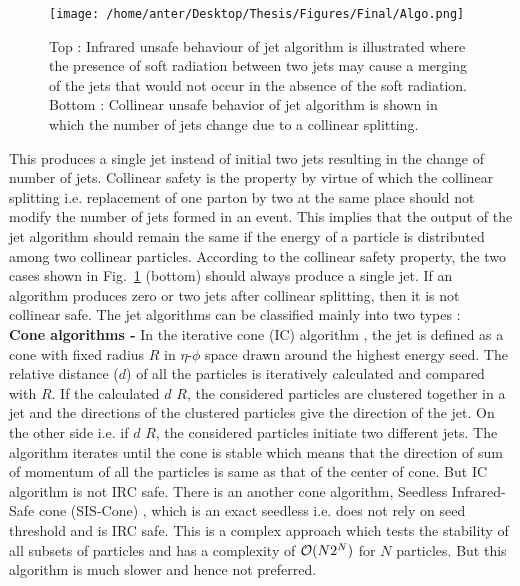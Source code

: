 \begin{figure}[h!]
\begin{center} 
\texttt{[image: /home/anter/Desktop/Thesis/Figures/Final/Algo.png]}\\
\caption[Illustration of infrared and collinear unsafe behaviour of jet algorithms.]{Top : Infrared unsafe behaviour of jet algorithm is illustrated where the presence of soft radiation between two jets may cause a merging of the jets that would not occur in the absence of the soft radiation. Bottom : Collinear unsafe behavior of jet algorithm is shown in which the number of jets change due to a collinear splitting\footnotemark.}
\label{fig:IRC}
\end{center}
\end{figure} This produces a single jet instead of initial two jets resulting in the change of number of jets. Collinear safety is the property by virtue of which the collinear splitting i.e. replacement of one parton by two at the same place should not modify the number of jets formed in an event. This implies that the output of the jet algorithm should remain the same if the energy of a particle is distributed among two collinear particles. According to the collinear safety property, the two cases shown in Fig.~\ref{fig:IRC} (bottom) should always produce a single jet. If an algorithm produces zero or two jets after collinear splitting, then it is not collinear safe. The jet algorithms can be classified mainly into two types : \\ \newline
{\bf Cone algorithms -} In the iterative cone (IC) algorithm \cite{Blazey:2000qt}, the jet is defined as a cone with fixed radius $R$ in $\eta$-$\phi$ space drawn around the highest energy seed. The relative distance ($d$) of all the particles is iteratively calculated and compared with $R$. If the calculated $d$ \ls $R$, the considered particles are clustered together in a jet and the directions of the clustered particles give the direction of the jet. On the other side i.e. if $d$ \gr $R$, the considered particles initiate two different jets. The algorithm iterates until the cone is stable which means that the direction of sum of momentum of all the particles is same as that of the center of cone. But IC algorithm is not IRC safe. There is an another cone algorithm, Seedless Infrared-Safe cone (SIS-Cone) \cite{Weinzierl:2011jx}, which is an exact seedless i.e. does not rely on seed threshold and is IRC safe. This is a complex approach which tests the stability of all subsets of particles and has a complexity of ${\cal O}(N2^{N})$ for $N$ particles. But this algorithm is much slower and hence not preferred. \\ \newline
